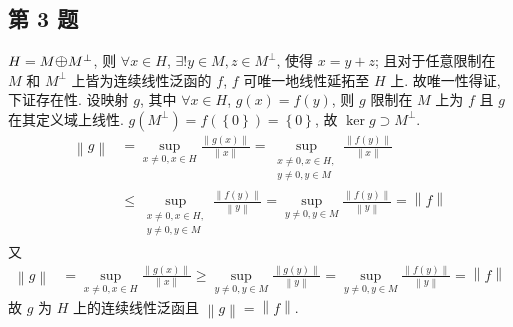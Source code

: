 \documentclass[\ROOT/main.tex]{subfiles}
\begin{document}
\subsection{第 3 题}
$H = M \mathlarger{\mathlarger{\oplus}} M^\bot$,
则 $\forall x \in H$, $\exists! y \in M, z \in M^\bot$, 使得 $x = y + z$;
且对于任意限制在 $M$ 和 $M^\bot$ 上皆为连续线性泛函的 $f$, $f$ 可唯一地线性延拓至 $H$ 上.
故唯一性得证, 下证存在性.
设映射 $g$, 其中 $\forall x \in H$, $g \left( x \right) = f \left( y \right)$, 则 $g$ 限制在 $M$ 上为 $f$ 且 $g$ 在其定义域上线性.
$g \left( M^\bot \right) = f \left( \left\{ 0 \right\} \right) = \left\{ 0 \right\}$, 故 $\ker g \supset M^\bot$.
\begin{align*}
    \left\| g \right\|
    &=
    \sup_{x \neq 0, x \in H}
    \frac{\left\| g \left( x \right) \right\|}{\left\| x \right\|}
    =
    \sup_{\substack{x \neq 0, x \in H, \\ y \neq 0, y \in M}}
    \frac{\left\| f \left( y \right) \right\|}{\left\| x \right\|} \\
    &\leqslant
    \sup_{\substack{x \neq 0, x \in H, \\ y \neq 0, y \in M}}
    \frac{\left\| f \left( y \right) \right\|}{\left\| y \right\|}
    =
    \sup_{y \neq 0, y \in M}
    \frac{\left\| f \left( y \right) \right\|}{\left\| y \right\|}
    = \left\| f \right\|
\end{align*}
又
\begin{align*}
    \left\| g \right\|
    &=
    \sup_{x \neq 0, x \in H}
    \frac{\left\| g \left( x \right) \right\|}{\left\| x \right\|}
    \geqslant
    \sup_{y \neq 0, y \in M}
    \frac{\left\| g \left( y \right) \right\|}{\left\| y \right\|}
    =
    \sup_{y \neq 0, y \in M}
    \frac{\left\| f \left( y \right) \right\|}{\left\| y \right\|}
    =
    \left\| f \right\|
\end{align*}
故 $g$ 为 $H$ 上的连续线性泛函且 $\left\| g \right\| = \left\| f \right\|$.
\end{document}
